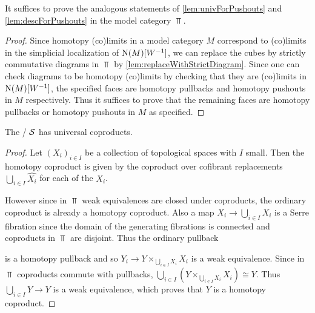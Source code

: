 \begin{corollary}\label{cor:sufficientToProveInModCat}
    It suffices to prove the analogous statements of \cref{lem:univForPushouts} and \cref{lem:descForPushouts} in the model category $\Top$.
    \begin{proof}
        Since homotopy (co)limits in a model category $M$ correspond to (co)limits in the simplicial localization of $\operatorname{N}(M)[W^{-1}]$, we can replace the cubes by strictly commutative diagrams in $\Top$ by \cref{lem:replaceWithStrictDiagram}.
        Since one can check diagrams to be homotopy (co)limits by checking that they are (co)limits in $\operatorname{N}(M)[W^{-1}]$, the specified faces are homotopy pullbacks and homotopy pushouts in $M$ respectively.
        Thus it suffices to prove that the remaining faces are homotopy pullbacks or homotopy pushouts in $M$ as specified. %
    \end{proof}
\end{corollary}
\begin{lemma}
    The \inftycat/ $\mathcal{S}$ has universal coproducts.
    \begin{proof}
        	Let $\left(X_i\right)_{i\in I}$ be a collection of topological spaces with $I$ small. 
            Then the homotopy coproduct is given by the coproduct over cofibrant replacements $\bigcup\limits_{i\in I}\widehat{X_i}$ for each of the $X_i$.

            However since in $\Top$ weak equivalences are closed under coproducts, the ordinary coproduct is already a homotopy coproduct.
            Also a map $X_i\to\bigcup\limits_{i\in I} X_i$ is a Serre fibration since the domain of the generating fibrations is connected and coproducts in $\Top$ are disjoint.
            Thus the ordinary pullback
            \begin{center}
            \end{center}
            is a homotopy pullback and so $Y_i\to Y\times_{\bigcup\limits_{i\in I} X_i}X_i$ is a weak equivalence.
            Since in $\Top$ coproducts commute with pullbacks, $\bigcup\limits_{i\in I}\left(Y\times_{\bigcup\limits_{i\in I} X_i}X_i\right)\cong Y$.
            Thus $\bigcup\limits_{i\in I}Y\to Y$ is a weak equivalence, which proves that $Y$ is a homotopy coproduct.
    \end{proof}
\end{lemma}
